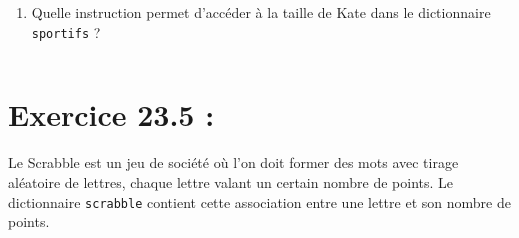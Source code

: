 \documentclass[12pt]{book}
\begin{document}
    \begin{tcolorbox}[breakable, size=fbox, boxrule=1pt, pad at break*=1mm,colback=cellbackground, colframe=cellborder]
\begin{Verbatim}[commandchars=\\\{\}]

\end{Verbatim}
\end{tcolorbox}

    \begin{enumerate}
\def\labelenumi{\arabic{enumi}.}
\setcounter{enumi}{2}
\tightlist
\item
  Quelle instruction permet d'accéder à la taille de Kate dans le
  dictionnaire \texttt{sportifs} ?
\end{enumerate}

    \begin{tcolorbox}[breakable, size=fbox, boxrule=1pt, pad at break*=1mm,colback=cellbackground, colframe=cellborder]
\begin{Verbatim}[commandchars=\\\{\}]

\end{Verbatim}
\end{tcolorbox}

    \hypertarget{exercice-23.5}{%
\section{Exercice 23.5 :}\label{exercice-23.5}}

Le Scrabble est un jeu de société où l'on doit former des mots avec
tirage aléatoire de lettres, chaque lettre valant un certain nombre de
points. Le dictionnaire \texttt{scrabble} contient cette association
entre une lettre et son nombre de points.
\end{document}
